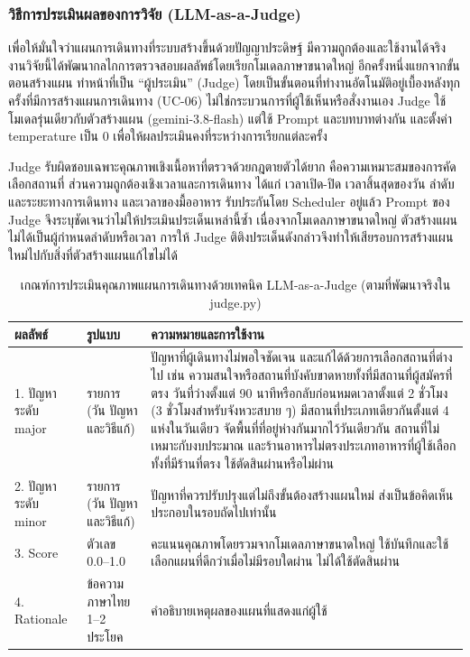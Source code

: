 \subsubsection{วิธีการประเมินผลของการวิจัย (LLM-as-a-Judge)}

เพื่อให้มั่นใจว่าแผนการเดินทางที่ระบบสร้างขึ้นด้วยปัญญาประดิษฐ์ มีความถูกต้องและใช้งานได้จริง งานวิจัยนี้ได้พัฒนากลไกการตรวจสอบผลลัพธ์โดยเรียกโมเดลภาษาขนาดใหญ่ อีกครั้งหนึ่งแยกจากขั้นตอนสร้างแผน ทำหน้าที่เป็น ``ผู้ประเมิน'' (Judge) โดยเป็นขั้นตอนที่ทำงานอัตโนมัติอยู่เบื้องหลังทุกครั้งที่มีการสร้างแผนการเดินทาง (UC-06) ไม่ใช่กระบวนการที่ผู้ใช้เห็นหรือสั่งงานเอง Judge ใช้โมเดลรุ่นเดียวกับตัวสร้างแผน (gemini-3.8-flash) แต่ใช้ Prompt และบทบาทต่างกัน และตั้งค่า temperature เป็น 0 เพื่อให้ผลประเมินคงที่ระหว่างการเรียกแต่ละครั้ง

Judge รับผิดชอบเฉพาะคุณภาพเชิงเนื้อหาที่ตรวจด้วยกฎตายตัวได้ยาก คือความเหมาะสมของการคัดเลือกสถานที่ ส่วนความถูกต้องเชิงเวลาและการเดินทาง ได้แก่ เวลาเปิด-ปิด เวลาสิ้นสุดของวัน ลำดับและระยะทางการเดินทาง และเวลาของมื้ออาหาร รับประกันโดย Scheduler อยู่แล้ว Prompt ของ Judge จึงระบุชัดเจนว่าไม่ให้ประเมินประเด็นเหล่านี้ซ้ำ เนื่องจากโมเดลภาษาขนาดใหญ่ ตัวสร้างแผนไม่ได้เป็นผู้กำหนดลำดับหรือเวลา การให้ Judge ติติงประเด็นดังกล่าวจึงทำให้เสียรอบการสร้างแผนใหม่ไปกับสิ่งที่ตัวสร้างแผนแก้ไขไม่ได้

\begin{table}[H]
\centering
\caption{เกณฑ์การประเมินคุณภาพแผนการเดินทางด้วยเทคนิค LLM-as-a-Judge (ตามที่พัฒนาจริงใน judge.py)}
\label{tab:llm_judge}
\begin{tabular}{|p{5.2cm}|p{2.8cm}|p{6cm}|}
\hline
\textbf{ผลลัพธ์} & \textbf{รูปแบบ} & \textbf{ความหมายและการใช้งาน} \\
\hline
1. ปัญหาระดับ major & รายการ (วัน ปัญหา และวิธีแก้) & ปัญหาที่ผู้เดินทางไม่พอใจชัดเจน และแก้ได้ด้วยการเลือกสถานที่ต่างไป เช่น ความสนใจหรือสถานที่บังคับขาดหายทั้งที่มีสถานที่ผู้สมัครที่ตรง วันที่ว่างตั้งแต่ 90 นาทีหรือกลับก่อนหมดเวลาตั้งแต่ 2 ชั่วโมง (3 ชั่วโมงสำหรับจังหวะสบาย ๆ) มีสถานที่ประเภทเดียวกันตั้งแต่ 4 แห่งในวันเดียว จัดพื้นที่ที่อยู่ห่างกันมากไว้วันเดียวกัน สถานที่ไม่เหมาะกับงบประมาณ และร้านอาหารไม่ตรงประเภทอาหารที่ผู้ใช้เลือกทั้งที่มีร้านที่ตรง ใช้ตัดสินผ่านหรือไม่ผ่าน \\ \hline
2. ปัญหาระดับ minor & รายการ (วัน ปัญหา และวิธีแก้) & ปัญหาที่ควรปรับปรุงแต่ไม่ถึงขั้นต้องสร้างแผนใหม่ ส่งเป็นข้อคิดเห็นประกอบในรอบถัดไปเท่านั้น \\ \hline
3. Score & ตัวเลข 0.0--1.0 & คะแนนคุณภาพโดยรวมจากโมเดลภาษาขนาดใหญ่ ใช้บันทึกและใช้เลือกแผนที่ดีกว่าเมื่อไม่มีรอบใดผ่าน ไม่ได้ใช้ตัดสินผ่าน \\ \hline
4. Rationale & ข้อความภาษาไทย 1--2 ประโยค & คำอธิบายเหตุผลของแผนที่แสดงแก่ผู้ใช้ \\
\hline
\end{tabular}
\end{table}

